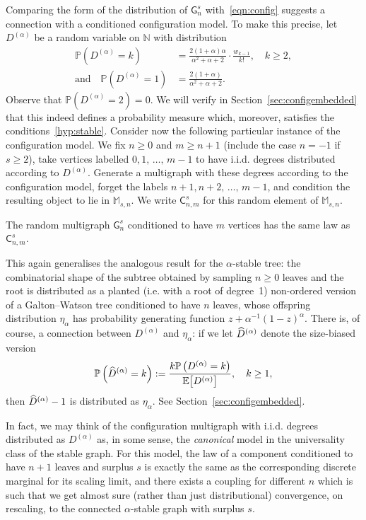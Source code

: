 \documentclass[AHL,Unicode,longabstracts,published]{cedram}
\newcommand{\sG}{\mathsf{G}}
\newcommand{\sC}{\mathsf{C}}
\newcommand{\M}{\mathbb{M}}
\newcommand{\N}{\mathbb{N}}
\newcommand{\bbE}{\mathbb{E}}
\newcommand{\bbP}{\mathbb{P}}
\let\oldhat\hat
\renewcommand*{\hat}[1]{\mathchoice{\widehat{#1}}{\widehat{#1}}{\oldhat{#1}}{\oldhat{#1}}}
\begin{document}
Comparing the form of the distribution of $\sG_n^s$ with~\eqref{eqn:config} suggests a connection with a conditioned configuration model. To make this precise, let $D^{(\alpha)}$ be a random variable on $\N$ with distribution
\begin{equation}\label{def:Dalpha}
\begin{split}
\bbP\left(D^{(\alpha)}=k\right) &= \frac{2(1+\alpha)\alpha}{\alpha^2+\alpha+2} \cdot \frac{w_{k-1}}{k!}, \quad k \geq 2, \\
\text{and} \quad \bbP\left(D^{(\alpha)}=1\right) &= \frac{2(1+\alpha)}{\alpha^2+\alpha+2}.
\end{split}
\end{equation}
Observe that $\bbP(D^{(\alpha)} = 2) = 0$. We will verify in Section~\ref{sec:configembedded} that this indeed defines a probability measure which, moreover, satisfies the conditions~\eqref{hyp:stable}. Consider now the following particular instance of the configuration model. We fix $n \ge 0$ and $m \ge n+1$ (include the case $n=-1$ if $s\geq 2$), take vertices labelled $0, 1,\,\ldots,\,m-1$ to have i.i.d. degrees distributed according to $D^{(\alpha)}$. Generate a multigraph with these degrees according to the configuration model, forget the labels $n+1, n+2, \,\ldots,\,m-1$, and condition the resulting object to lie in $\M_{s,n}$. We write $\sC_{n,m}^s$ for this random element of $\M_{s,n}$.

\begin{coro}\label{cor:identification}
The random multigraph $\sG_{n}^s$ conditioned to have $m$ vertices has the same law as $\sC_{n,m}^s$.
\end{coro}

This again generalises the analogous result for the $\alpha$-stable tree: the combinatorial shape of the subtree obtained by sampling $n \geq 0$ leaves and the root is distributed as a planted (i.e. with a root of degree~1) non-ordered version of a Galton--Watson tree conditioned to have $n$ leaves, whose offspring distribution $\eta_\alpha$ has probability generating function $z+\alpha^{-1}(1-z)^{\alpha}$. There is, of course, a connection between $D^{(\alpha)}$ and $\eta_\alpha$: if we let $\hat{D}^{(\alpha)}$ denote the size-biased version
\[
\bbP\left(\hat{D}^{(\alpha)}=k\right):= \frac{k \bbP\left(D^{(\alpha)}=k\right)}{\bbE\big[D^{(\alpha)}\big]}, \quad k \geq 1,
\]
then $\hat{D}^{(\alpha)}-1$ is distributed as $\eta_\alpha$. See Section~\ref{sec:configembedded}.

In fact, we may think of the configuration multigraph with i.i.d. degrees distributed as $D^{(\alpha)}$ as, in some sense, the \emph{canonical} model in the universality class of the stable graph. For this model, the law of a component conditioned to have $n+1$ leaves and surplus $s$ is exactly the same as the corresponding discrete marginal for its scaling limit, and there exists a coupling for different $n$ which is such that we get almost sure (rather than just distributional) convergence, on rescaling, to the connected $\alpha$-stable graph with surplus $s$.
\end{document}
